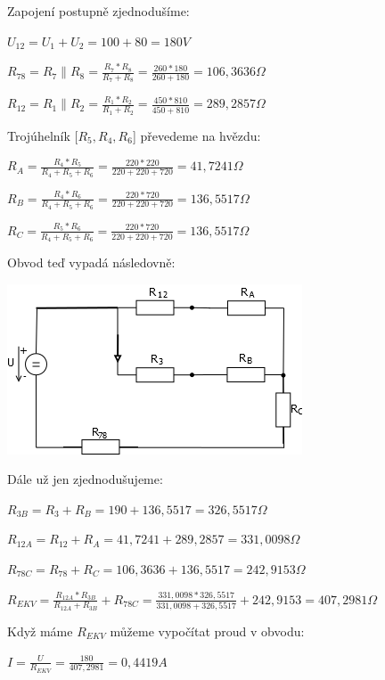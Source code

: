 \documentclass{article}
\begin{document}
Zapojení postupně zjednodušíme:

\vspace{1pc}

\centerline{$U_{12} = U_1+U_2 = 100+80 = 180 V$}
\centerline{$R_{78} = R_7 \parallel R_8 = \frac{ R_7*R_8}{ R_7+R_8} = \frac{260*180}{260+180} = 106,3636 \Omega$}
\centerline{$R_{12} = R_1 \parallel R_2 = \frac{ R_1*R_2}{ R_1+R_2} = \frac{450*810}{450+810} = 289,2857 \Omega$}


\vspace{2pc}

\clearpage

\noindent Trojúhelník [$R_5 , R_4 , R_6$] převedeme na hvězdu:

\vspace{1pc}

\centerline{$R_A =\frac{ R_4*R_5}{R_4+R_5+R_6} = \frac{220*220}{220+220+720} =41,7241 \Omega$}
\centerline{$R_B =\frac{ R_4*R_6}{R_4+R_5+R_6} = \frac{220*720}{220+220+720} =136,5517 \Omega$}
\centerline{$R_C =\frac{ R_5*R_6}{R_4+R_5+R_6} = \frac{220*720}{220+220+720} =136,5517 \Omega$}

\vspace{2pc}
\noindent Obvod teď vypadá následovně:

\centerline{\includegraphics{zjednoduseny1}}


\noindent Dále už jen zjednodušujeme:

\vspace{1pc}
\centerline{$R_{3B}= R_3+R_B = 190+136,5517 = 326,5517 \Omega$}
\centerline{$R_{12A}= R_{12}+R_A = 41,7241+289,2857 = 331,0098 \Omega$}
\centerline{$R_{78C}= R_{78}+R_C = 106,3636+136,5517 = 242,9153 \Omega$}
\centerline{$R_{EKV}= \frac{R_{12A}*R_{3B}}{R_{12A}+R_{3B}}+R_{78C} = \frac{331,0098*326,5517}{331,0098+326,5517}+242,9153 = 407,2981 \Omega$}
\vspace{2pc}
\noindent Když máme $R_{EKV}$ můžeme vypočítat proud v obvodu:

\vspace{1pc}
\centerline{$I = \frac{U}{R_{EKV}} = \frac{180}{407,2981} = 0,4419 A$}
\clearpage
\end{document}
